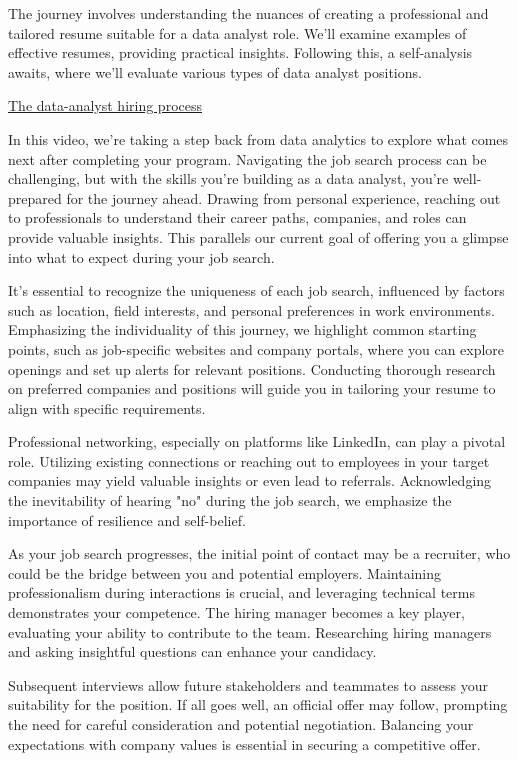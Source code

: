 \documentclass[]{article}
\begin{document}
The journey involves understanding the nuances of creating a professional and tailored resume suitable for a data analyst role. We'll examine examples of effective resumes, providing practical insights. Following this, a self-analysis awaits, where we'll evaluate various types of data analyst positions.

\uline{The data-analyst hiring process}

In this video, we're taking a step back from data analytics to explore what comes next after completing your program. Navigating the job search process can be challenging, but with the skills you're building as a data analyst, you're well-prepared for the journey ahead. Drawing from personal experience, reaching out to professionals to understand their career paths, companies, and roles can provide valuable insights. This parallels our current goal of offering you a glimpse into what to expect during your job search.

It's essential to recognize the uniqueness of each job search, influenced by factors such as location, field interests, and personal preferences in work environments. Emphasizing the individuality of this journey, we highlight common starting points, such as job-specific websites and company portals, where you can explore openings and set up alerts for relevant positions. Conducting thorough research on preferred companies and positions will guide you in tailoring your resume to align with specific requirements.

Professional networking, especially on platforms like LinkedIn, can play a pivotal role. Utilizing existing connections or reaching out to employees in your target companies may yield valuable insights or even lead to referrals. Acknowledging the inevitability of hearing "no" during the job search, we emphasize the importance of resilience and self-belief.

As your job search progresses, the initial point of contact may be a recruiter, who could be the bridge between you and potential employers. Maintaining professionalism during interactions is crucial, and leveraging technical terms demonstrates your competence. The hiring manager becomes a key player, evaluating your ability to contribute to the team. Researching hiring managers and asking insightful questions can enhance your candidacy.

Subsequent interviews allow future stakeholders and teammates to assess your suitability for the position. If all goes well, an official offer may follow, prompting the need for careful consideration and potential negotiation. Balancing your expectations with company values is essential in securing a competitive offer.
\end{document}

